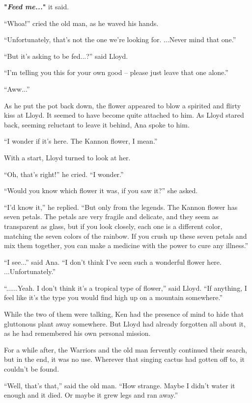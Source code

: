 \documentclass[
]{article}
\begin{document}
\textbf{"}\emph{\textbf{Feed me...}}\textbf{"} it said.

``Whoa!'' cried the old man, as he waved his hands.

``Unfortunately, that's not the one we're looking for. ...Never mind
that one.''

``But it's asking to be fed...?'' said Lloyd.

``I'm telling you this for your own good -- please just leave that one
alone.''

``Aww...''

As he put the pot back down, the flower appeared to blow a spirited and
flirty kiss at Lloyd. It seemed to have become quite attached to him. As
Lloyd stared back, seeming reluctant to leave it behind, Ana spoke to
him.

``I wonder if it's here. The Kannon flower, I mean.''

With a start, Lloyd turned to look at her.

``Oh, that's right!'' he cried. ``I wonder.''

``Would you know which flower it was, if you saw it?'' she asked.

``I'd know it,'' he replied. ``But only from the legends. The Kannon
flower has seven petals. The petals are very fragile and delicate, and
they seem as transparent as glass, but if you look closely, each one is
a different color, matching the seven colors of the rainbow. If you
crush up these seven petals and mix them together, you can make a
medicine with the power to cure any illness.''

``I see...'' said Ana. ``I don't think I've seen such a wonderful flower
here. ...Unfortunately.''

``......Yeah. I don't think it's a tropical type of flower,'' said
Lloyd. ``If anything, I feel like it's the type you would find high up
on a mountain somewhere.''

While the two of them were talking, Ken had the presence of mind to hide
that gluttonous plant away somewhere. But Lloyd had already forgotten
all about it, as he had remembered his own personal mission.

For a while after, the Warriors and the old man fervently continued
their search, but in the end, it was no use. Wherever that singing
cactus had gotten off to, it couldn't be found.

``Well, that's that,'' said the old man. ``How strange. Maybe I didn't
water it enough and it died. Or maybe it grew legs and ran away.''
\end{document}
